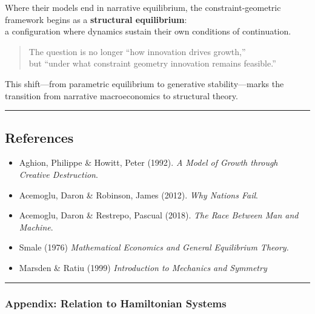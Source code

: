\documentclass[11pt]{article}
\begin{document}
Where their models end in narrative equilibrium, the
constraint-geometric framework begins as a \textbf{structural
equilibrium}:\\
a configuration where dynamics sustain their own conditions of
continuation.

\begin{quote}
The question is no longer ``how innovation drives growth,''\\
but ``under what constraint geometry innovation remains feasible.''
\end{quote}

This shift---from parametric equilibrium to generative stability---marks
the transition from narrative macroeconomics to structural theory.

\begin{center}\rule{0.5\linewidth}{0.5pt}\end{center}

\subsection{References}\label{references}

\begin{itemize}
\tightlist
\item
  Aghion, Philippe \& Howitt, Peter (1992). \emph{A Model of Growth
  through Creative Destruction}.\\
\item
  Acemoglu, Daron \& Robinson, James (2012). \emph{Why Nations Fail}.\\
\item
  Acemoglu, Daron \& Restrepo, Pascual (2018). \emph{The Race Between
  Man and Machine}.\\
\item
  Smale (1976) \emph{Mathematical Economics and General Equilibrium
  Theory.}
\item
  Marsden \& Ratiu (1999) \emph{Introduction to Mechanics and Symmetry}
\end{itemize}

\begin{center}\rule{0.5\linewidth}{0.5pt}\end{center}

\subsubsection{\texorpdfstring{\textbf{Appendix: Relation to Hamiltonian
Systems}}{Appendix: Relation to Hamiltonian Systems}}\label{appendix-relation-to-hamiltonian-systems}
\end{document}
